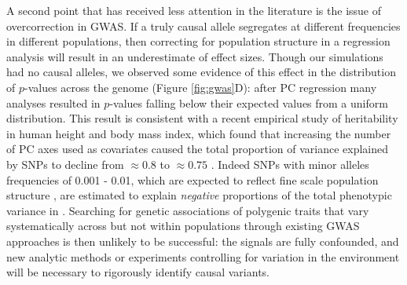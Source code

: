 \documentclass[11pt,twoside,lineno]{preprint}
\newif\ifcomments
\newcommand{\ak}[1]{\ifcomments{{\color{red} \it (#1)}}\else{}\fi}
\begin{document}
A second point that has received less attention in the literature is the issue of overcorrection in GWAS. If a truly causal allele segregates at different frequencies in different populations, then correcting for population structure in a regression analysis will result in an underestimate of effect sizes. Though our simulations had no causal alleles, we observed some evidence of this effect in the distribution of $p$-values across the genome (Figure \ref{fig:gwas}D): after PC regression many analyses resulted in $p$-values falling below their expected values from a uniform distribution. This result is consistent with a recent empirical study of heritability in human height and body mass index, which found that increasing the number of PC axes used as covariates caused the total proportion of variance explained by SNPs to decline from $\approx0.8$ to $\approx0.75$ \citep{Wainschtein2019}. Indeed SNPs with minor alleles frequencies of 0.001 - 0.01, which are expected to reflect fine scale population structure \citep{Mathieson2012,Novembre2009}, are estimated to explain \textit{negative} proportions of the total phenotypic variance in \citep{Wainschtein2019}\ak{i don't understand what the authors mean here -- how can we have a negative variance?}. Searching for genetic associations of polygenic traits that vary systematically across but not within populations through existing GWAS approaches is then unlikely to be successful: the signals are fully confounded, and new analytic methods or experiments controlling for variation in the environment will be necessary to rigorously identify causal variants. 
\end{document}
